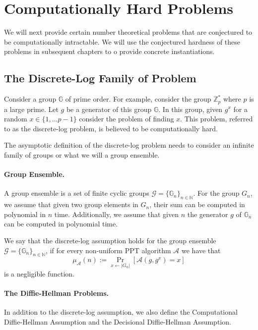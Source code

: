 \section{Computationally  Hard Problems}\label{sec:assumptions}
We will next provide certain number theoretical problems that are conjectured to be computationally intractable. We will use the conjectured hardness of these problems in subsequent chapters to o provide concrete instantiations.

\subsection{The Discrete-Log Family of Problem}
Consider a group $\mathbb{G}$ of prime order. For example, consider the group $\mathbb{Z}_p^*$ where $p$ is a large prime. Let $g$ be a generator of this group $\mathbb{G}$. In this group, given $g^x$ for a random $x \in \{1,\ldots p-1\}$ consider the problem of finding $x$. This problem, referred to as the discrete-log problem, is believed to be computationally hard.

The asymptotic definition of the discrete-log problem needs to consider an infinite family of groups or what we will a group ensemble. 

\paragraph{Group Ensemble.} A group ensemble is a set of finite cyclic groups $\mathcal{G} =\{ \mathbb{G}_n\}_{n \in \mathbb{N}}$. For the group $G_n$, we assume that given two group elements in $G_n$, their sum can be computed in polynomial in $n$ time. Additionally, we assume that given $n$ the generator $g$ of $\mathbb{G}_n$ can be computed in polynomial time. 

\begin{definition}\label{def:dl}
We say that the discrete-log assumption holds for the group ensemble $\mathcal{G} =\{ \mathbb{G}_n\}_{n \in \mathbb{N}}$, if for every non-uniform PPT algorithm $\mathcal{A}$ we have that
\[\mu_\mathcal{A}(n) := \Pr_{x \leftarrow |G_n|}[\mathcal{A}(g,g^x) = x]\]
is a negligible function.
\end{definition}

\paragraph{The Diffie-Hellman Problems.} In addition to the discrete-log assumption, we also define the Computational Diffie-Hellman Assumption and the Decisional Diffie-Hellman Assumption. 

